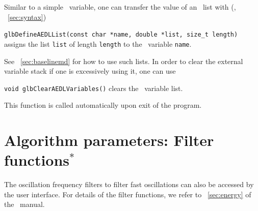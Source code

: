 Similar to a simple \AEDL\ variable, one can transfer the value of an
\AEDL\ list with (\cf, \Sec~\ref{sec:syntax})
\begin{function}
{\tt glbDefineAEDLList(const char *name, double *list, size\_t length)} assigns the list {\tt list}
of length {\tt length} to the \AEDL\ variable {\tt name}.
\end{function}
See \Sec~\ref{sec:baselinemd} for how to use such lists.
%
In order to clear the external variable stack if one is
excessively using it, one can use
\begin{function}
{\tt void glbClearAEDLVariables()}
clears the \AEDL\ variable list.
\end{function}
This function is called automatically upon exit of the program.

\section{Algorithm parameters: Filter functions$^*$}

The oscillation frequency filters to filter fast oscillations
can also be accessed by the user interface. For details of
the filter functions, we refer to \Sec~\ref{sec:energy} of
the \AEDL\ manual.


